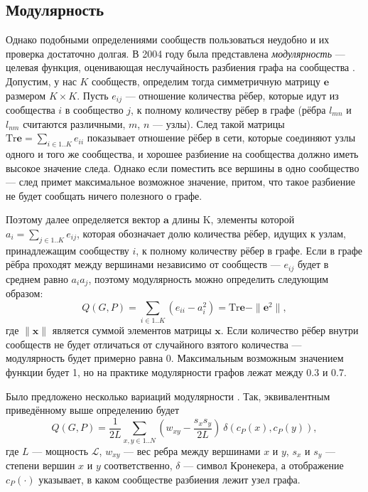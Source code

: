 
\subsection{Модулярность}

Однако подобными определениями сообществ пользоваться неудобно и их проверка достаточно долгая. В 2004 году была представлена \emph{модулярность} --- целевая функция, оценивающая неслучайность разбиения графа на сообщества \cite{Newman&Girvan:2004}. Допустим, у нас $K$ сообществ, определим тогда симметричную матрицу $\mathbf{e}$ размером $K \times K$. Пусть $e_{ij}$ --- отношение количества рёбер, которые идут из сообщества $i$ в сообщество $j$, к полному количеству рёбер в графе (рёбра $l_{mn}$ и $l_{nm}$ считаются различными, $m$, $n$ --- узлы). След такой матрицы $\mathrm{Tr} \mathbf{e} = \sum_{i \in 1..K}{e_{ii}}$ показывает отношение рёбер в сети, которые соединяют узлы одного и того же сообщества, и хорошее разбиение на сообщества должно иметь высокое значение следа. Однако если поместить все вершины в одно сообщество --- след примет максимальное возможное значение, притом, что такое разбиение не будет сообщать ничего полезного о графе.

Поэтому далее определяется вектор $\mathbf{a}$ длины K, элементы которой $a_i = \sum_{j \in 1..K}{e_{ij}}$, которая обозначает долю количества рёбер, идущих к узлам, принадлежащим сообществу $i$, к полному количеству рёбер в графе. Если в графе рёбра проходят между вершинами независимо от сообществ --- $e_{ij}$ будет в среднем равно $a_i a_j$, поэтому модулярность можно определить следующим образом:
\begin{equation} \label{eq:q1}
Q(G, P) = \sum_{i \in 1..K}{\left(e_{ii} - a_i^2\right)} = \mathrm{Tr} \mathbf{e} - \|\mathbf{e}^2\|,
\end{equation}
где $\|\mathbf{x}\|$ является суммой элементов матрицы $\mathbf{x}$. Если количество рёбер внутри сообществ не будет отличаться от случайного взятого количества --- модулярность будет примерно равна 0. Максимальным возможным значением функции будет 1, но на практике модулярности графов лежат между 0.3 и 0.7.

Было предложено несколько вариаций модулярности \cite{Muff&Rao&Caflisch:2005, Fortunato&Barthelemy:2007}. Так, эквивалентным приведённому выше определению будет
\begin{equation}
Q(G, P) = \frac{1}{2L} \sum_{x, y \in 1..N} \left(w_{xy} - \frac{s_x s_y}{2L}\right)\ \delta(c_P(x), c_P(y)),
\end{equation}
где $L$ --- мощность $\mathscr{L}$, $w_{xy}$ --- вес ребра между вершинами $x$ и $y$, $s_x$ и $s_y$ --- степени вершин $x$ и $y$ соответственно, $\delta$ --- символ Кронекера, а отображение $c_P(\cdot)$ указывает, в каком сообществе разбиения лежит узел графа.

